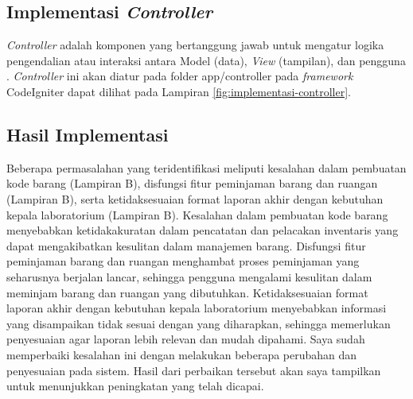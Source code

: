 \subsection{Implementasi \textit{Controller}}
\textit{Controller} adalah komponen yang bertanggung jawab untuk mengatur logika pengendalian atau interaksi antara Model (data), \textit{View} (tampilan), dan pengguna \cite{rahman2018perancangan}. \textit{Controller} ini akan diatur pada folder app/controller pada \textit{framework} CodeIgniter dapat dilihat pada Lampiran \ref{fig:implementasi-controller}.

\subsection{Hasil Implementasi}
Beberapa permasalahan yang teridentifikasi meliputi kesalahan dalam pembuatan kode barang (Lampiran B), disfungsi fitur peminjaman barang dan ruangan (Lampiran B), serta ketidaksesuaian format laporan akhir dengan kebutuhan kepala laboratorium (Lampiran B). Kesalahan dalam pembuatan kode barang menyebabkan ketidakakuratan dalam pencatatan dan pelacakan inventaris yang dapat mengakibatkan kesulitan dalam manajemen barang. Disfungsi fitur peminjaman barang dan ruangan menghambat proses peminjaman yang seharusnya berjalan lancar, sehingga pengguna mengalami kesulitan dalam meminjam barang dan ruangan yang dibutuhkan. Ketidaksesuaian format laporan akhir dengan kebutuhan kepala laboratorium menyebabkan informasi yang disampaikan tidak sesuai dengan yang diharapkan, sehingga memerlukan penyesuaian agar laporan lebih relevan dan mudah dipahami. Saya sudah memperbaiki kesalahan ini dengan melakukan beberapa perubahan dan penyesuaian pada sistem. Hasil dari perbaikan tersebut akan saya tampilkan untuk menunjukkan peningkatan yang telah dicapai.

